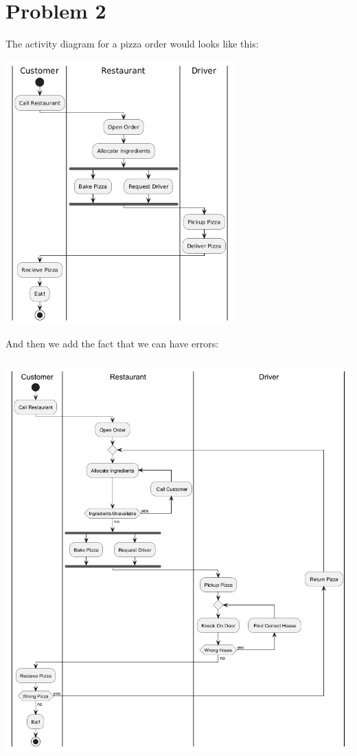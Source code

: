 \documentclass[12pt]{article}
\begin{document}
\clearpage
\section*{Problem 2}

The activity diagram for a pizza order would looks like this:

\begin{center}
	\includegraphics[height=4in]{pizzaUMLNoErrors}
\end{center}

\clearpage
And then we add the fact that we can have errors:

\begin{center}
	\includegraphics[height=6in]{pizzaUMLWithErrors}
\end{center}
\end{document}
